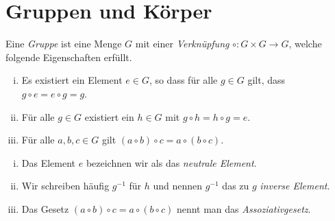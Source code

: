 \documentclass[../main.tex]{subfiles}
\begin{document}
\section{Gruppen und Körper}
\begin{definition}
  Eine \textit{Gruppe} ist eine Menge $G$
  mit einer \textit{Verknüpfung} $\circ \colon G \times G \to G$,
  welche folgende Eigenschaften erfüllt.
  \begin{enumerate}[(i)]
    \item Es existiert ein Element $e \in G$, so dass
      für alle $g \in G$ gilt, dass
      $g \circ e = e \circ g = g$.
    \item Für alle $g \in G$ existiert ein $h \in G$
      mit
      $g \circ h = h \circ g = e$.
    \item Für alle $a,b,c \in G$ gilt
      $(a \circ b) \circ c = a \circ (b \circ c)$.
  \end{enumerate}
\end{definition}

\begin{notation}
  \leavevmode
  \begin{enumerate}[(i)]
    \item Das Element $e$ bezeichnen wir als das \textit{neutrale Element}.
    \item Wir schreiben häufig $g^{-1}$ für $h$ und nennen $g^{-1}$
      das zu $g$ \textit{inverse Element}.
    \item Das Gesetz $(a \circ b) \circ c = a \circ (b \circ c)$ nennt man das \textit{Assoziativgesetz}.
  \end{enumerate}
\end{notation}
\end{document}
